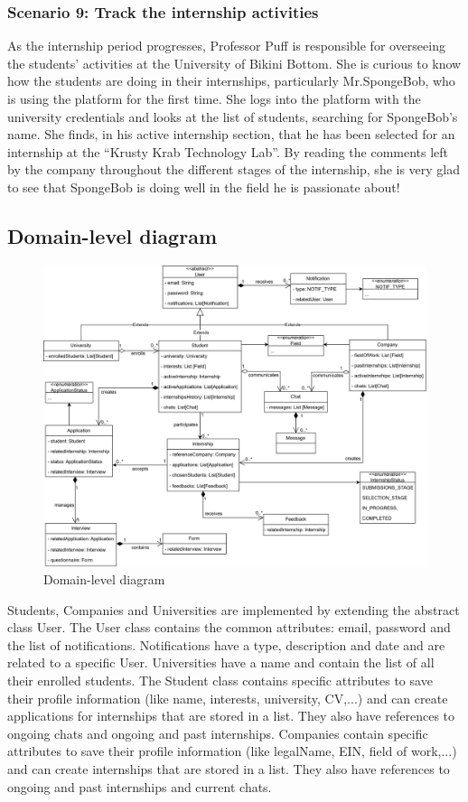 \subsubsection{Scenario 9: Track the internship activities}\label{subsubsec:scenario_9}
As the internship period progresses, Professor Puff is responsible for overseeing the students' activities at the University of Bikini Bottom. 
She is curious to know how the students are doing in their internships, particularly Mr.SpongeBob, who is using the platform for the first time. 
She logs into the platform with the university credentials and looks at the list of students, searching for SpongeBob's name. She finds, 
in his active internship section, that he has been selected for an internship at the ``Krusty Krab Technology Lab''. By reading the comments
left by the company throughout the different stages of the internship, she is very glad to see that SpongeBob is doing well in the field he is 
passionate about!


\subsection{Domain-level diagram}\label{subsec:domain_level_diagram}
\begin{figure}[H]
    \centering
    \includegraphics[width=1\textwidth]{Images/UML_Class_diagram.png}
    \caption{Domain-level diagram}\label{fig:domain-lebel_diagram}
\end{figure}
Students, Companies and Universities are implemented by extending the abstract class User. The User class contains the common attributes: email, 
password and the list of notifications. Notifications have a type, description and date and are related to a specific User. Universities have a 
name and contain the list of all their enrolled students. The Student class contains specific attributes to save their profile information (like 
name, interests, university, CV,...) and can create applications for internships that are stored in a list. They also have references to ongoing 
chats and ongoing and past internships. Companies contain specific attributes to save their profile information (like legalName, EIN, field of 
work,...) and can create internships that are stored in a list. They also have references to ongoing and past internships and current chats. 

